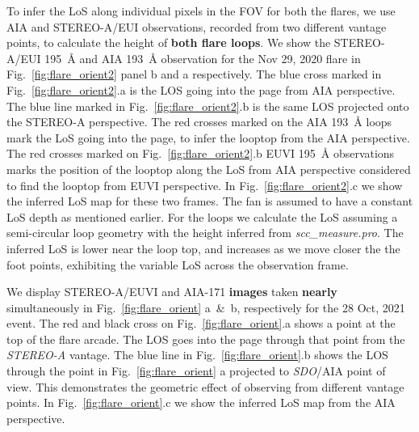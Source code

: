 To infer the LoS along individual pixels in the FOV for both the flares, we use AIA and STEREO-A/EUI observations, recorded from two different vantage points, to calculate the height of {\bf both flare loops}. We show the STEREO-A/EUI 195~{\AA} and AIA 193~{\AA} observation for the Nov 29, 2020 flare in Fig.~\ref{fig:flare_orient2} panel b and a respectively. The blue cross marked in Fig.~\ref{fig:flare_orient2}.a is the LOS going into the page from AIA perspective. The blue line marked in Fig.~\ref{fig:flare_orient2}.b is the same LOS projected onto the STEREO-A perspective. The red crosses marked on the AIA 193~{\AA} loops mark the LoS going into the page, to infer the looptop from the AIA perspective. The red crosses marked on Fig.~\ref{fig:flare_orient2}.b EUVI 195~{\AA} observations marks the position of the looptop along the LoS from AIA perspective considered to find the looptop from EUVI perspective. In Fig.~\ref{fig:flare_orient2}.c we show the inferred LoS map for these two frames. The fan is assumed to have a constant LoS depth as mentioned earlier. For the loops we calculate the LoS assuming a semi-circular loop geometry with the height inferred from \textit{scc\_measure.pro}. The inferred LoS is lower near the loop top, and increases as we move closer the the foot points, exhibiting the variable LoS across the observation frame.

We display STEREO-A/EUVI and AIA-171 {\bf images} taken {\bf nearly} simultaneously in Fig.~\ref{fig:flare_orient} a~\&~b, respectively for the 28 Oct, 2021 event. The red and black cross on Fig.~\ref{fig:flare_orient}.a shows a point at the top of the flare arcade. The LOS goes into the page through that point from the {\it STEREO-A} vantage. The blue line in Fig.~\ref{fig:flare_orient}.b shows the LOS through the point in Fig.~\ref{fig:flare_orient} a projected to {\it SDO}/AIA point of view. This demonstrates the geometric effect of observing from different vantage points. In Fig.~\ref{fig:flare_orient}.c we show the inferred LoS map from the AIA perspective. 


